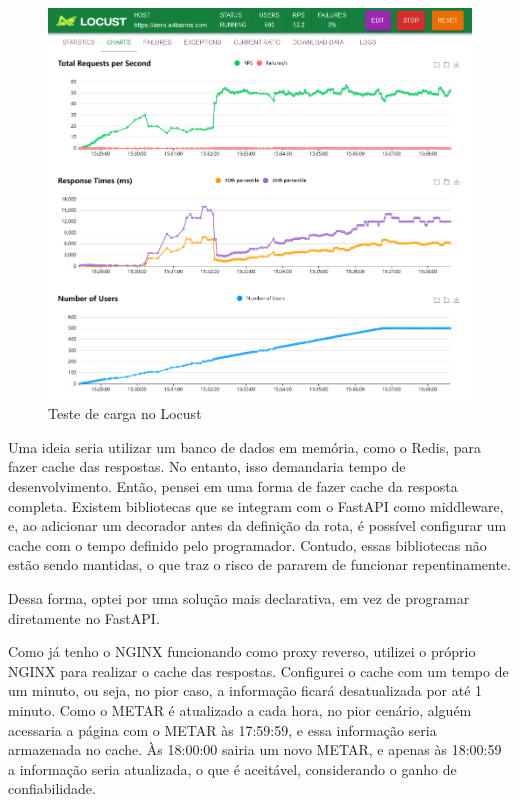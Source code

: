 \begin{figure}[ht]
    \begin{center}
    \includegraphics[width=400pt]{img/locust-no-cache.png}
    \caption{Teste de carga no Locust}
    \label{fig:locust-no-cache}
    \end{center}
\end{figure}


Uma ideia seria utilizar um banco de dados em memória, como o Redis, para fazer cache das respostas. 
No entanto, isso demandaria tempo de desenvolvimento. Então, pensei em uma forma de fazer cache da 
resposta completa. Existem bibliotecas que se integram com o FastAPI como middleware, e, ao adicionar 
um decorador antes da definição da rota, é possível configurar um cache com o tempo definido pelo 
programador. Contudo, essas bibliotecas não estão sendo mantidas, o que traz o risco de pararem de 
funcionar repentinamente.

Dessa forma, optei por uma solução mais declarativa, em vez de programar diretamente no FastAPI.

Como já tenho o NGINX funcionando como proxy reverso, utilizei o próprio NGINX para realizar o cache 
das respostas. Configurei o cache com um tempo de um minuto, ou seja, no pior caso, a informação 
ficará desatualizada por até 1 minuto. Como o METAR é atualizado a cada hora, no pior cenário, alguém 
acessaria a página com o METAR às 17:59:59, e essa informação seria armazenada no cache. Às 18:00:00 
sairia um novo METAR, e apenas às 18:00:59 a informação seria atualizada, o que é aceitável, considerando
o ganho de confiabilidade.

